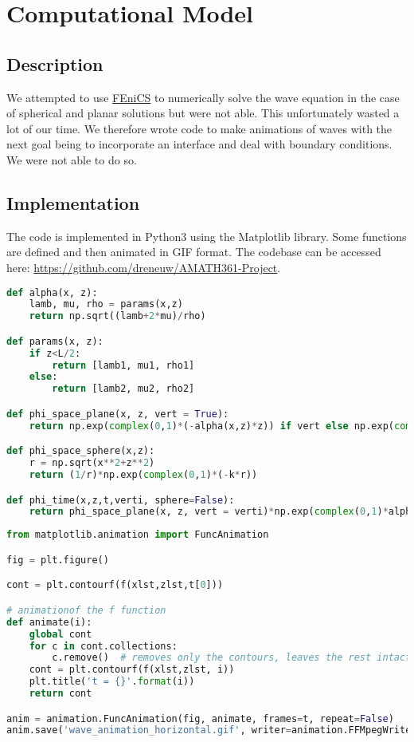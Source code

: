 \chapter{Computational Model}
\section{Description}
We attempted to use \href{https://fenicsproject.org/}{FEniCS} to numerically solve the wave equation in the case of spherical and planar solutions but were not able. This unfortunately wasted a lot of our time. We therefore wrote code to make animations of waves with the next goal being to incorporate an interface and deal with boundary conditions. We were not able to do so. 

\section{Implementation}
The code is implemented in Python3 using the Matplotlib library. Some functions are defined and then animated in GIF format. The codebase can be accessed here: \url{https://github.com/dreneuw/AMATH361-Project}.
\begin{lstlisting}[language=python, caption=Function Definitions for Wavefunctions,label=my_code]
def alpha(x, z):
    lamb, mu, rho = params(x,z)
    return np.sqrt((lamb+2*mu)/rho)

def params(x, z):      
    if z<L/2:
        return [lamb1, mu1, rho1]
    else:
        return [lamb2, mu2, rho2]

def phi_space_plane(x, z, vert = True):
    return np.exp(complex(0,1)*(-alpha(x,z)*z)) if vert else np.exp(complex(0,1)*(-alpha(x,z)*x))

def phi_space_sphere(x,z):
    r = np.sqrt(x**2+z**2)
    return (1/r)*np.exp(complex(0,1)*(-k*r))

def phi_time(x,z,t,verti, sphere=False):
    return phi_space_plane(x, z, vert = verti)*np.exp(complex(0,1)*alpha(x,z)*t) if not sphere else phi_space_sphere(x, z)*np.exp(complex(0,1)*alpha(x,z)*t)
\end{lstlisting}
\begin{lstlisting}[language=python, caption=Sample animation code,label=my_code2]
from matplotlib.animation import FuncAnimation

fig = plt.figure()

cont = plt.contourf(f(xlst,zlst,t[0]))

# animationof the f function
def animate(i):
    global cont
    for c in cont.collections:
        c.remove()  # removes only the contours, leaves the rest intact
    cont = plt.contourf(f(xlst,zlst, i))
    plt.title('t = {}'.format(i))
    return cont

anim = animation.FuncAnimation(fig, animate, frames=t, repeat=False)
anim.save('wave_animation_horizontal.gif', writer=animation.FFMpegWriter())
\end{lstlisting}
